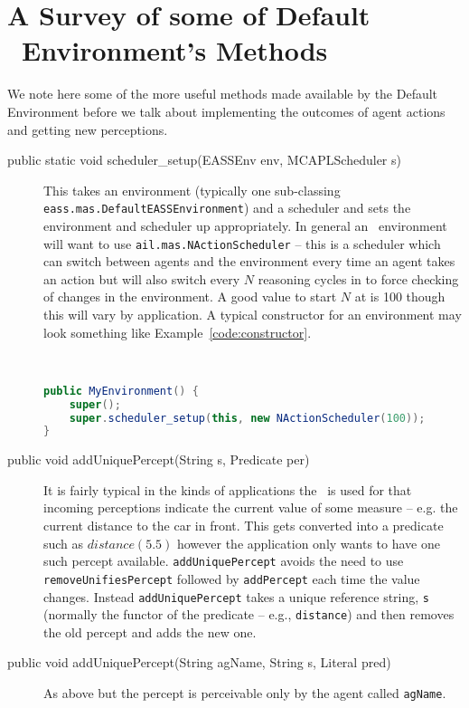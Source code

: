 \section{A Survey of some of Default \eass\ Environment's Methods}
We note here some of the more useful methods made available by the Default Environment before we talk about implementing the outcomes of agent actions and getting new perceptions.

\begin{sloppypar}
\begin{description}
\item[public static void scheduler\_setup(EASSEnv env, MCAPLScheduler s)] This takes an environment (typically one sub-classing \texttt{eass.mas.DefaultEASSEnvironment}) and a scheduler and sets the environment and scheduler up appropriately.  In general an \eass\ environment will want to use \texttt{ail.mas.NActionScheduler} -- this is a scheduler which can switch between agents and the environment every time an agent takes an action but will also switch every $N$ reasoning cycles in to force checking of changes in the environment.  A good value to start $N$ at is 100 though this will vary by application.  A typical constructor for an environment may look something like Example~\ref{code:constructor}.
\begin{ourexample}
\label{code:constructor} \quad \\
\begin{lstlisting}[basicstyle=\sffamily,language=Java,style=easslisting]
public MyEnvironment() {
	super();
	super.scheduler_setup(this, new NActionScheduler(100));
}
\end{lstlisting}
\end{ourexample}
\item[public void addUniquePercept(String s, Predicate per)] It is fairly typical in the kinds of applications the \eass\ is used for that incoming perceptions indicate the current value of some measure -- e.g. the current distance to the car in front.  This gets converted into a predicate such as $distance(5.5)$ however the application only wants to have one such percept available.  \texttt{addUniquePercept} avoids the need to use \texttt{removeUnifiesPercept} followed by \texttt{addPercept} each time the value changes.  Instead \texttt{addUniquePercept} takes a unique reference string, \texttt{s} (normally the functor of the predicate -- e.g., \texttt{distance}) and then removes the old percept and adds the new one. 
\item[public void addUniquePercept(String agName, String s, Literal  pred)] As above but the percept is perceivable only by the agent called \texttt{agName}.
\end{description}
\end{sloppypar}

